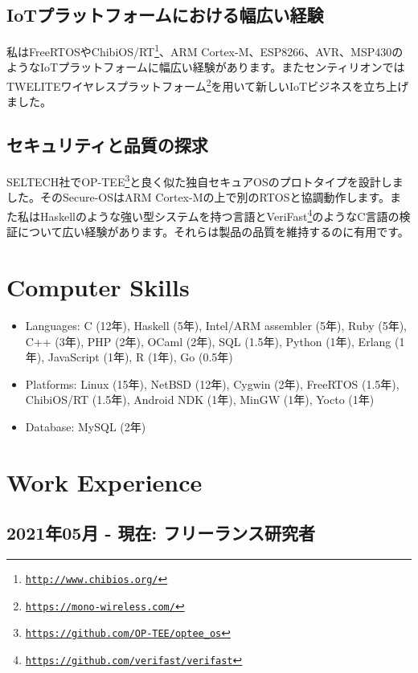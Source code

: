 \documentclass[letterpaper]{article}
\begin{document}
\subsection*{IoTプラットフォームにおける幅広い経験}

私はFreeRTOSやChibiOS/RT\footnote{\href{http://www.chibios.org/}{\tt http://www.chibios.org/}}、ARM Cortex-M、ESP8266、AVR、MSP430のようなIoTプラットフォームに幅広い経験があります。またセンティリオンではTWELITEワイヤレスプラットフォーム\footnote{\href{https://mono-wireless.com/}{\tt https://mono-wireless.com/}}を用いて新しいIoTビジネスを立ち上げました。

\subsection*{セキュリティと品質の探求}

SELTECH社でOP-TEE\footnote{\href{https://github.com/OP-TEE/optee\_os}{\tt https://github.com/OP-TEE/optee\_os}}と良く似た独自セキュアOSのプロトタイプを設計しました。そのSecure-OSはARM Cortex-Mの上で別のRTOSと協調動作します。また私はHaskellのような強い型システムを持つ言語とVeriFast\footnote{\href{https://github.com/verifast/verifast}{\tt https://github.com/verifast/verifast}}のようなC言語の検証について広い経験があります。それらは製品の品質を維持するのに有用です。

\section*{Computer Skills}

\begin{itemize}
  \item Languages: C (12年), Haskell (5年), Intel/ARM assembler (5年), Ruby (5年), C++ (3年), PHP (2年), OCaml (2年), SQL (1.5年), Python (1年), Erlang (1年), JavaScript (1年), R (1年), Go (0.5年)
  \item Platforms: Linux (15年), NetBSD (12年), Cygwin (2年), FreeRTOS (1.5年), ChibiOS/RT (1.5年), Android NDK (1年), MinGW (1年), Yocto (1年)
  \item Database: MySQL (2年)
\end{itemize}

\newpage

\section*{Work Experience}

\subsection*{2021年05月 - 現在: フリーランス研究者}
\end{document}
